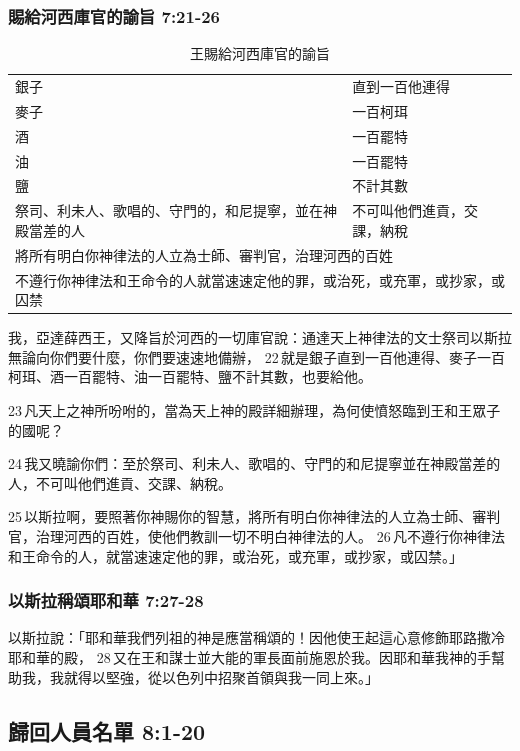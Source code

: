 \subsubsection{賜給河西庫官的諭旨 7:21-26}
\begin{table}[!hbp]
\centering 
\begin{tabular}{|p{6cm}|p{5cm}|}
\hline
\hline
銀子& 直到一百他連得\\
麥子&一百柯珥\\
酒&一百罷特\\
油&一百罷特\\
鹽&不計其數\\\hline
祭司、利未人、歌唱的、守門的，和尼提寧，並在神殿當差的人& 不可叫他們進貢，交課，納稅\\\hline
\multicolumn{2}{|l|}{將所有明白你神律法的人立為士師、審判官，治理河西的百姓}\\\hline
\multicolumn{2}{|l|}{不遵行你神律法和王命令的人就當速速定他的罪，或治死，或充軍，或抄家，或囚禁}\\\hline
\end{tabular}
\caption{王賜給河西庫官的諭旨}
\end{table}
我，亞達薛西王，又降旨於河西的一切庫官說：通達天上神律法的文士祭司以斯拉無論向你們要什麼，你們要速速地備辦， 22 就是銀子直到一百他連得、麥子一百柯珥、酒一百罷特、油一百罷特、鹽不計其數，也要給他。 

23 凡天上之神所吩咐的，當為天上神的殿詳細辦理，為何使憤怒臨到王和王眾子的國呢？ 

24 我又曉諭你們：至於祭司、利未人、歌唱的、守門的和尼提寧並在神殿當差的人，不可叫他們進貢、交課、納稅。

 25 以斯拉啊，要照著你神賜你的智慧，將所有明白你神律法的人立為士師、審判官，治理河西的百姓，使他們教訓一切不明白神律法的人。 26 凡不遵行你神律法和王命令的人，就當速速定他的罪，或治死，或充軍，或抄家，或囚禁。」

\subsubsection{以斯拉稱頌耶和華 7:27-28}
以斯拉說：「耶和華我們列祖的神是應當稱頌的！因他使王起這心意修飾耶路撒冷耶和華的殿， 28 又在王和謀士並大能的軍長面前施恩於我。因耶和華我神的手幫助我，我就得以堅強，從以色列中招聚首領與我一同上來。」

\subsection{歸回人員名單 8:1-20}
